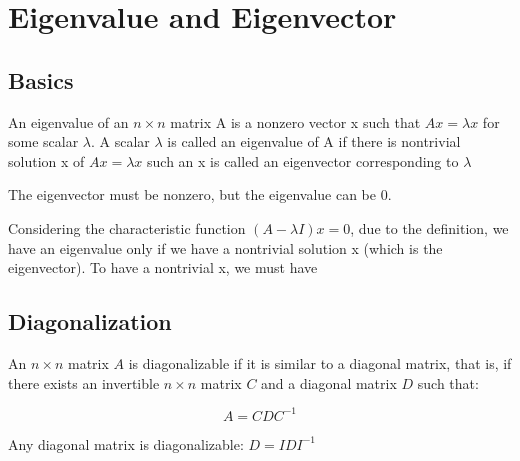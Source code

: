 \chapter{Eigenvalue and Eigenvector}

\section{Basics}

% 



\begin{definition}
    An eigenvalue of an \(n \times  n\)  matrix A is a nonzero vector x such that \(Ax = \lambda x\) for some scalar \(\lambda \). 
    A scalar \(\lambda \) is called an eigenvalue of A if there is nontrivial solution x of \(Ax = \lambda x\) such an x is called an eigenvector corresponding to \(\lambda \)       
\end{definition}

\begin{remark}
    The eigenvector must be nonzero, but the eigenvalue can be 0.
\end{remark}

Considering the characteristic function \((A - \lambda I)x = 0\), due to the definition, we have an eigenvalue only if we have a nontrivial solution x (which is the eigenvector). To have a nontrivial x, we must have 


\section{Diagonalization}

\begin{definition}[diagonalization]
   An $n  \times n$ matrix $A$ is diagonalizable if it is similar to a diagonal matrix, that is, if there exists an invertible $n \times n$ matrix $C$ and a diagonal matrix $D$ such that:

   $$A = C D C^{-1}$$
\end{definition}

\begin{eg}
    Any diagonal matrix is diagonalizable:  $D = IDI^{-1}$    
\end{eg}

